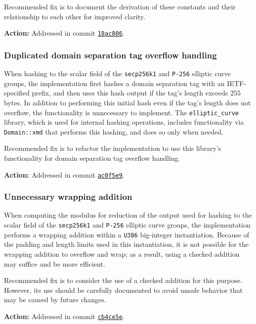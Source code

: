 \documentclass{article}
\begin{document}
Recommended fix is to document the derivation of these constants and their relationship to each other for improved clarity.

\textbf{Action:} Addressed in commit \href{https://github.com/serai-dex/serai/commit/18ac80671ff27932c8b7b0ca1a4fea14532ea7a8}{\texttt{18ac806}}.


\subsubsection{Duplicated domain separation tag overflow handling}

When hashing to the scalar field of the \texttt{secp256k1} and \texttt{P-256} elliptic curve groups, the implementation first hashes a domain separation tag with an IETF-specified prefix, and then uses this hash output if the tag's length exceeds $255$ bytes.
In addition to performing this initial hash even if the tag's length does not overflow, the functionality is unnecessary to implement.
The \texttt{elliptic\_curve} library, which is used for internal hashing operations, includes functionality via \texttt{Domain::xmd} that performs this hashing, and does so only when needed.

Recommended fix is to refactor the implementation to use this library's functionality for domain separation tag overflow handling.

\textbf{Action:} Addressed in commit \href{https://github.com/serai-dex/serai/commit/ac0f5e9b2d7a9ab6a61271742696f748ba4c2806}{\texttt{ac0f5e9}}.


\subsubsection{Unnecessary wrapping addition}

When computing the modulus for reduction of the output used for hashing to the scalar field of the \texttt{secp256k1} and \texttt{P-256} elliptic curve groups, the implementation performs a wrapping addition within a \texttt{U386} big-integer instantiation.
Because of the padding and length limits used in this instantiation, it is not possible for the wrapping addition to overflow and wrap; as a result, using a checked addition may suffice and be more efficient.

Recommended fix is to consider the use of a checked addition for this purpose.
However, its use should be carefully documented to avoid unsafe behavior that may be caused by future changes.

\textbf{Action:} Addressed in commit \href{https://github.com/serai-dex/serai/commit/cb4ce5e354c1e36ef0ff2425e82b7fdbeeb971e9}{\texttt{cb4ce5e}}.
\end{document}
